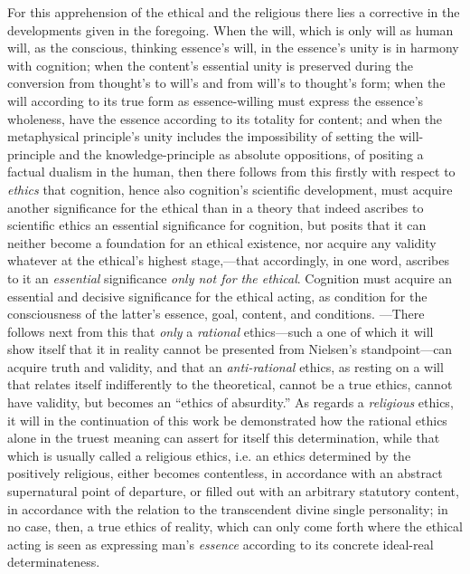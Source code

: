 \documentclass[12pt,a4paper]{book}
\begin{document}
For this apprehension of the ethical and the religious there lies a corrective in the developments given
in the foregoing. When the will, which is only will as human will, as the conscious, thinking essence's
will, in the essence's unity is in harmony with cognition; when the content's essential unity is
preserved during the conversion from thought's to will's and from will's to thought's form; when the
will according to its true form as essence-willing must express the essence's wholeness, have the essence
according to its totality for content; and when the metaphysical principle's unity includes the
impossibility of setting the will-principle and the knowledge-principle as absolute oppositions, of
positing a factual dualism in the human, then there follows from this firstly with respect to \emph{ethics}
that cognition, hence also cognition's scientific development, must acquire another significance for the
ethical than in a theory that indeed ascribes to scientific ethics an essential significance for
cognition, but posits that it can neither become a foundation for an ethical existence, nor acquire any
validity whatever at the ethical's highest stage,---that accordingly, in one word, ascribes to it an
\emph{essential} significance \emph{only not for the ethical}. Cognition must acquire an essential and decisive
significance for the ethical acting, as condition for the consciousness of the latter's essence, goal,
content, and conditions. ---There follows next from this that \emph{only} a \emph{rational} ethics---such a one
of which it will show itself that it in reality cannot be presented from Nielsen's standpoint---can
acquire truth and validity, and that an \emph{anti-rational} ethics, as resting on a will that relates
itself indifferently to the theoretical, cannot be a true ethics, cannot have validity, but becomes an
``ethics of absurdity.'' As regards a \emph{religious} ethics, it will in the continuation of this work be
demonstrated how the rational ethics alone in the truest meaning can assert for itself this
determination, while that which is usually called a religious ethics, i.e. an ethics determined by the
positively religious, either becomes contentless, in accordance with an abstract supernatural point of
departure, or filled out with an arbitrary statutory content, in accordance with the relation to the
transcendent divine single personality; in no case, then, a true ethics of reality, which can only come
forth where the ethical acting is seen as expressing man's \emph{essence} according to its concrete ideal-real
determinateness.
\end{document}
